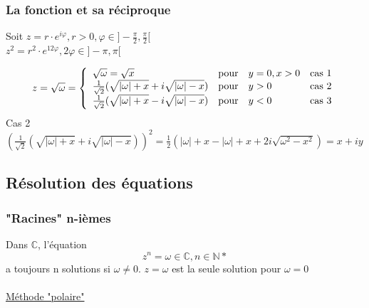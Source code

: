 \documentclass[12pt,a4paper]{article}
\begin{document}
{\subsubsection{La fonction et sa réciproque }
Soit $z = r\cdot e^{i\varphi}, r > 0, \varphi \in ]-\frac{\pi}{2}, \frac{\pi}{2}[$\\
$z^2 = r^2 \cdot e^{12\varphi}, 2\varphi  \in ]-\pi, \pi[$

\[
z = \sqrt{\omega} =
\left\{
\begin{array}{l c l r}
\sqrt{\omega} = \sqrt{x}  & $pour$ & y = 0, x > 0 & $cas 1$\\
\frac{1}{\sqrt{2}}(\sqrt{|\omega| + x} + i \sqrt{|\omega| -x}) & $pour$ & y > 0 & $cas 2$\\
\frac{1}{\sqrt{2}}(\sqrt{|\omega| + x} - i\sqrt{|\omega| - x}) & $pour$ & y < 0 & $cas 3$
\end{array}
\right.
\]
Cas 2 $(\frac{1}{\sqrt{2}}(\sqrt{|\omega| + x} + i\sqrt{|\omega| - x}))^2 = \frac{1}{2} (|\omega| + x - |\omega| + x + 2i \sqrt{\omega^2 - x^2}) = x + iy$

\subsection{Résolution des équations}
\subsubsection{"Racines" n-ièmes}
Dans $\mathbb{C}$, l'équation 
\begin{equation}
z^n = \omega \in \mathbb{C}, n \in \mathbb{N*}
\end{equation}
a toujours n solutions si $\omega \neq 0$. $z = \omega$ est la seule solution pour $\omega = 0$\\
\\
\underline{Méthode "polaire"}

}
\end{document}
